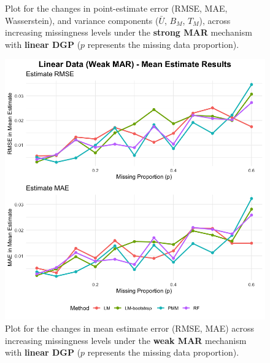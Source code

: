 \documentclass[12pt,oneside]{amsart}
\theoremstyle{definition}
\theoremstyle{remark}
\numberwithin{equation}{section}
\begin{document}
\begin{figure}[ht]
\begin{minipage}[b]{0.48\linewidth}
        \caption{Plot for the changes in point-estimate error (RMSE, MAE, Wasserstein), and variance components ($\bar{U}$, $B_M$, $T_M$), across increasing missingness levels under the \textbf{strong MAR} mechanism with \textbf{linear DGP} ($p$ represents the missing data proportion).}
        \label{fig:result_linear_mar}
    \end{minipage}
\end{figure}

\begin{figure}[ht]
    \centering
    \begin{minipage}[b]{0.48\linewidth}
        \centering
        \includegraphics[width=\linewidth]{Report/Figure/mean_linear_wmar.jpg}
        \caption{Plot for the changes in mean estimate error (RMSE, MAE) across increasing missingness levels under the \textbf{weak MAR} mechanism with \textbf{linear DGP} ($p$ represents the missing data proportion).}
        \label{fig:mean_linear_wmar}
    \end{minipage}
    \hfill
    \begin{minipage}[b]{0.48\linewidth}
        \centering

\end{minipage}
\end{figure}
\end{document}
